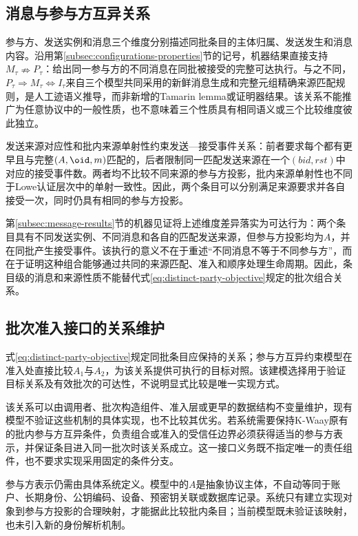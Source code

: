 \subsection{消息与参与方互异关系}
\label{subsec:relation-discussion}

参与方、发送实例和消息三个维度分别描述同批条目的主体归属、发送发生和消息内容。沿用第\ref{subsec:configurations-properties}节的记号，机器结果直接支持$M_\tau\nRightarrow P_\tau$：给出同一参与方的不同消息在同批被接受的完整可达执行。与之不同，$P_\tau\Rightarrow M_\tau\Leftrightarrow I_\tau$来自三个模型共同采用的新鲜消息生成和完整元组精确来源匹配规则，是人工迹语义推导，而非新增的Tamarin lemma或证明器结果。该关系不能推广为任意协议中的一般性质，也不意味着三个性质具有相同语义或三个比较维度彼此独立。

发送来源对应性和批内来源单射性约束发送—接受事件关系：前者要求每个\receiveraccept 都有更早且与完整$(A,\oid,m)$匹配的\sendaction，后者限制同一匹配发送来源在一个$(\mathit{bid},\mathit{rst})$中对应的接受事件数。两者均不比较不同来源的参与方投影，批内来源单射性也不同于Lowe认证层次中的单射一致性。因此，两个条目可以分别满足来源要求并各自接受一次，同时仍具有相同的参与方投影。

第\ref{subsec:message-results}节的机器见证将上述维度差异落实为可达行为：两个条目具有不同发送实例、不同消息和各自的匹配发送来源，但参与方投影均为$A$，并在同批产生接受事件。该执行的意义不在于重述“不同消息不等于不同参与方”，而在于证明这种组合能够通过共同的来源匹配、准入和顺序处理生命周期。因此，条目级的消息和来源性质不能替代式\eqref{eq:distinct-party-objective}规定的批次组合关系。

\subsection{批次准入接口的关系维护}
\label{subsec:interface-maintenance}

式\eqref{eq:distinct-party-objective}规定同批条目应保持的关系；参与方互异约束模型在准入处直接比较$A_1$与$A_2$，为该关系提供可执行的目标对照。该建模选择用于验证目标关系及有效批次的可达性，不说明显式比较是唯一实现方式。

该关系可以由调用者、批次构造组件、准入层或更早的数据结构不变量维护，现有模型不验证这些机制的具体实现，也不比较其优劣。若系统需要保持K-Waay原有的批内参与方互异条件，负责组合或准入的受信任边界必须获得适当的参与方表示，并保证条目进入同一批次时该关系成立。这一接口义务既不指定唯一的责任组件，也不要求实现采用固定的条件分支。

参与方表示仍需由具体系统定义。模型中的$A$是抽象协议主体，不自动等同于账户、长期身份、公钥编码、设备、预密钥关联或数据库记录。系统只有建立实现对象到参与方投影的合理映射，才能据此比较批内条目；当前模型既未验证该映射，也未引入新的身份解析机制。

